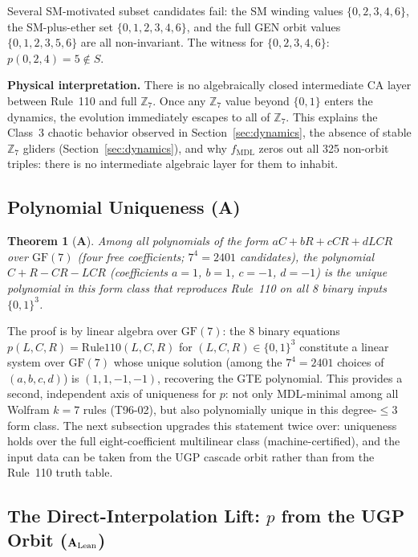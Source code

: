 \documentclass[11pt]{article}
\newtheorem{theorem}{Theorem}[section]
\theoremstyle{remark}
\newcommand{\ZS}{\ensuremath{\mathbb{Z}_7}}
\newcommand{\GF}[1]{\ensuremath{\mathrm{GF}(#1)}}
\newcommand{\fmdl}{\ensuremath{f_{\mathrm{MDL}}}}
\newcommand{\CatA}{\textbf{A}}
\newcommand{\CatAL}{\texorpdfstring{\ensuremath{\textbf{A}_{\rm Lean}}}{A-Lean}}
\begin{document}
Several SM-motivated subset candidates fail: the SM winding values
$\{0,2,3,4,6\}$, the SM-plus-ether set $\{0,1,2,3,4,6\}$, and the full GEN
orbit values $\{0,1,2,3,5,6\}$ are all non-invariant. The witness for
$\{0,2,3,4,6\}$: $p(0,2,4) = 5 \notin S$.

\medskip
\noindent\textbf{Physical interpretation.}
There is no algebraically closed intermediate CA layer between Rule~110 and
full $\ZS$. Once any $\ZS$ value beyond $\{0,1\}$ enters the dynamics,
the evolution immediately escapes to all of $\ZS$. This explains the Class~3
chaotic behavior observed in Section~\ref{sec:dynamics}, the absence of stable
$\ZS$ gliders (Section~\ref{sec:dynamics}), and why $\fmdl{}$ zeros out all
325 non-orbit triples: there is no intermediate algebraic layer for them to
inhabit.

\subsection{Polynomial Uniqueness (\CatA{})}

\begin{theorem}[\CatA{}]
\label{thm:polyuniq}
Among all polynomials of the form $aC + bR + cCR + dLCR$ over $\GF{7}$
(four free coefficients; $7^4 = 2401$ candidates), the polynomial
$C+R-CR-LCR$ (coefficients $a = 1$, $b = 1$, $c = -1$, $d = -1$) is the
\emph{unique} polynomial in this form class that reproduces Rule~110 on
all 8 binary inputs $\{0,1\}^3$.
\end{theorem}

The proof is by linear algebra over $\GF{7}$: the 8 binary equations
$p(L,C,R) = \mathrm{Rule110}(L,C,R)$ for $(L,C,R) \in \{0,1\}^3$ constitute
a linear system over $\GF{7}$ whose unique solution (among the $7^4 = 2401$
choices of $(a,b,c,d)$) is $(1,1,-1,-1)$, recovering the GTE polynomial.
This provides a second, independent axis of uniqueness for $p$: not only
MDL-minimal among all Wolfram $k{=}7$ rules (T96-02), but also polynomially
unique in this degree-${\leq}3$ form class. The next subsection upgrades
this statement twice over: uniqueness holds over the full eight-coefficient
multilinear class (machine-certified), and the input data can be taken from
the UGP cascade orbit rather than from the Rule~110 truth table.

\subsection{The Direct-Interpolation Lift: \texorpdfstring{$p$}{p} from the
UGP Orbit (\CatAL{})}
\label{subsec:lift}
\end{document}
